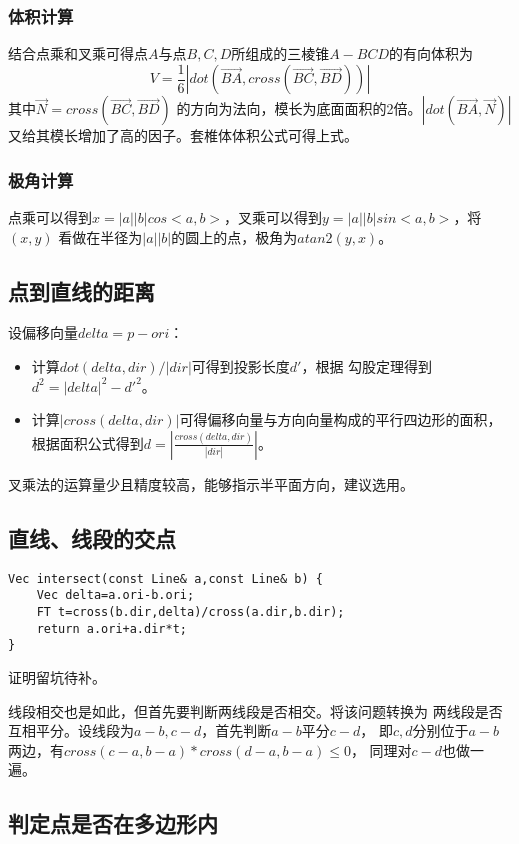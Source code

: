 \subsubsection{体积计算}
结合点乘和叉乘可得点$A$与点$B,C,D$所组成的三棱锥$A-BCD$的有向体积为
\begin{displaymath}
	V=\frac{1}{6}|dot(\overrightarrow{BA},cross(\overrightarrow{BC},
	\overrightarrow{BD}))|
\end{displaymath}
其中$\overrightarrow{N}=cross(\overrightarrow{BC},\overrightarrow{BD})$
的方向为法向，模长为底面面积的2倍。$|dot(\overrightarrow{BA},\overrightarrow{N})|$
又给其模长增加了高的因子。套椎体体积公式可得上式。
\subsubsection{极角计算}
点乘可以得到$x=|a||b|cos<a,b>$，叉乘可以得到$y=|a||b|sin<a,b>$，将$(x,y)$
看做在半径为$|a||b|$的圆上的点，极角为$atan2(y,x)$。
\subsection{点到直线的距离}
设偏移向量$delta=p-ori$：
\begin{itemize}
	\item 计算$dot(delta,dir)/|dir|$可得到投影长度$d'$，根据
	      勾股定理得到$d^2=|delta|^2-d'^2$。
	\item 计算$|cross(delta,dir)|$可得偏移向量与方向向量构成的平行四边形的面积，
	      根据面积公式得到$d=|\frac{cross(delta,dir)}{|dir|}|$。
\end{itemize}
叉乘法的运算量少且精度较高，能够指示半平面方向，建议选用。
\subsection{直线、线段的交点}
\begin{lstlisting}
Vec intersect(const Line& a,const Line& b) {
    Vec delta=a.ori-b.ori;
    FT t=cross(b.dir,delta)/cross(a.dir,b.dir);
    return a.ori+a.dir*t;
}
\end{lstlisting}
证明留坑待补。

线段相交也是如此，但首先要判断两线段是否相交。将该问题转换为
两线段是否互相平分。设线段为$a-b,c-d$，首先判断$a-b$平分$c-d$，
即$c,d$分别位于$a-b$两边，有$cross(c-a,b-a)*cross(d-a,b-a)\leq 0$，
同理对$c-d$也做一遍。
\subsection{判定点是否在多边形内}
